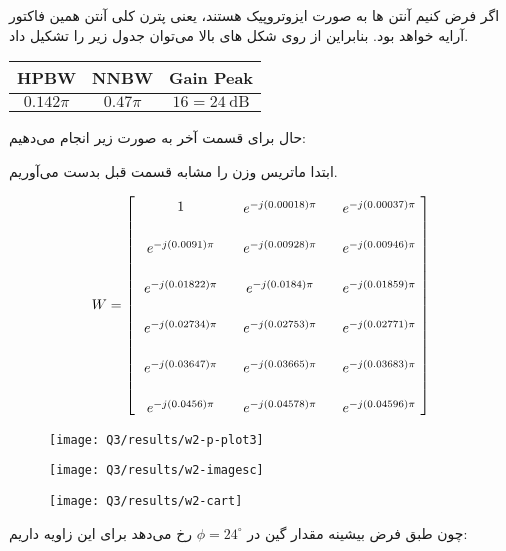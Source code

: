 \documentclass[12pt,onecolumn,a4paper]{article}
\begin{document}
		

	اگر فرض کنیم آنتن ها به صورت ایزوتروپیک هستند، یعنی پترن کلی آنتن همین فاکتور آرایه خواهد بود. بنابراین از روی شکل های بالا می‌توان جدول زیر را تشکیل داد.
	
\begin{table}[H]
	\centering
	\begin{tabular}{ccc}
		\toprule\rowcolor{gray!10}
		\textbf{HPBW} & \textbf{NNBW} & \textbf{Gain Peak}\\\midrule
		$0.142\pi$ & $0.47\pi$ & $16 = 24 \ \text{dB}$ \\
		\bottomrule
	\end{tabular}
\end{table}


حال برای قسمت آخر به صورت زیر انجام می‌دهیم:


ابتدا ماتریس وزن را مشابه قسمت قبل بدست می‌آوریم.

\begin{equation}
	W = 
	\left[
	\raisebox{-2.7cm}{
		\begin{tikzpicture}[node distance=1cm, every node/.style={anchor=center}]
			\def\dr{2.5}
			\def\dc{1}
			\foreach \m in {0,1,2,3,4,5} {
				\foreach \n in {0,1,2} {
					\pgfmathparse{\m + \n}%
					\pgfmathtruncatemacro{\sum}{\pgfmathresult} %
					\pgfmathsetmacro{\p}{(2 * (\m * sin(pi/6)*cos(pi/4) * 0.5 + \n * sin(pi/6)*sin(pi/4) * 0.8))}%
					\ifnum\sum=0
					\node at (\n*\dr,-\m*\dc) {$1$};
					\else
					\node at (\n*\dr,-\m*\dc) {$e^{-j (\p) \pi}$};
					\fi
				}
			}
	\end{tikzpicture}}
	\right]
\end{equation}


	
\begin{figure}[H]
	\centering
	\texttt{[image: Q3/results/w2-p-plot3]}
	\caption{}
	\label{fig:w2-p-plot3}
\end{figure}

\begin{figure}[H]
	\centering
	\texttt{[image: Q3/results/w2-imagesc]}
	\caption{}
	\label{fig:w2-imagesc}
\end{figure}

\begin{figure}[H]
	\centering
	\texttt{[image: Q3/results/w2-cart]}
	\caption{}
	\label{fig:w2-cart}
\end{figure}
چون طبق فرض بیشینه مقدار گین در $\phi = 24^\circ$ رخ می‌دهد برای این زاویه داریم:
\end{document}
